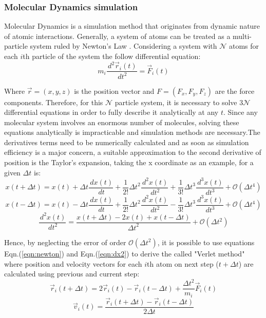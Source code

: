 \documentclass[10pt,a4paper,twoside]{article}
\begin{document}
\subsubsection{Molecular Dynamics simulation}

Molecular Dynamics is a simulation method that originates from dynamic nature of atomic interactions. Generally, a system of atoms can be treated as a multi-particle system ruled by Newton's Law \cite{umd}. Considering a system with $\mathcal{N}$ atoms for each $i$th particle of the system the follow differential equation:
\begin{equation}
m_i\dfrac{\,d^2\vec{r}_i(t)}{\,dt^2} = \vec{F}_i(t)
\label{eqn:newton}
\end{equation}

Where $\vec{r} = (x,y,z)$ is the position vector and $F = (F_x, F_y, F_z)$ are the force components. Therefore, for this $\mathcal{N}$ particle system, it is necessary to solve $3\mathcal{N}$ differential equations in order to fully describe it analytically at any $t$. Since any molecular system involves an enormous number of molecules, solving these equations analytically is impracticable and simulation methods are necessary.The derivatives terms need to be numerically calculated and as soon as simulation efficiency is a major concern, a suitable approximation to the second derivative of position is the Taylor's expansion, taking the x coordinate as an example, for a given $\Delta t$ is:
\begin{equation}
x(t+\Delta t) = x(t) + \Delta t \dfrac{\,dx(t)}{\,dt} + \dfrac{1}{2!}{\Delta t}^2 \dfrac{\,d^2x(t)}{\,dt^2} + \dfrac{1}{3!}{\Delta t}^3 \dfrac{\,d^3x(t)}{\,dt^3} +  \mathcal{O}(\Delta t^4)
\label{eqn:taylor1}
\end{equation}
\begin{equation}
x(t-\Delta t) = x(t) - \Delta t \dfrac{\,dx(t)}{\,dt} + \dfrac{1}{2!}{\Delta t}^2 \dfrac{\,d^2x(t)}{\,dt^2} - \dfrac{1}{3!}{\Delta t}^3 \dfrac{\,d^3x(t)}{\,dt^3} +  \mathcal{O}(\Delta t^4)
\label{eqn:taylor2}
\end{equation}
\begin{equation}
\dfrac{\,d^2x(t)}{\,dt^2} = \dfrac{x(t+\Delta t) - 2 x(t) + x(t-\Delta t)}{{\Delta t}^2} +  \mathcal{O}(\Delta t^2)
\label{eqn:dx2}
\end{equation}

Hence, by neglecting the error of order $\mathcal{O}(\Delta t^2)$, it is possible to use equations Eqn.(\ref{eqn:newton}) and Eqn.(\ref{eqn:dx2}) to derive the called "Verlet method" where position and velocity vectors for each $i$th atom on next step ($t+\Delta t$) are calculated using previous and current step:
\begin{equation}
\vec{r}_i(t+\Delta t) = 2 \vec{r}_i(t) - \vec{r}_i(t-\Delta t) + \dfrac{{\Delta t}^2}{m_i}\vec{F}_i(t)
\label{eqn:verletr}
\end{equation}
\begin{equation}
\vec{v}_i(t) =  \dfrac{\vec{r}_i(t+\Delta t) - \vec{r}_i(t-\Delta t)}{2{\Delta t}}
\label{eqn:verletv}
\end{equation}
\end{document}
